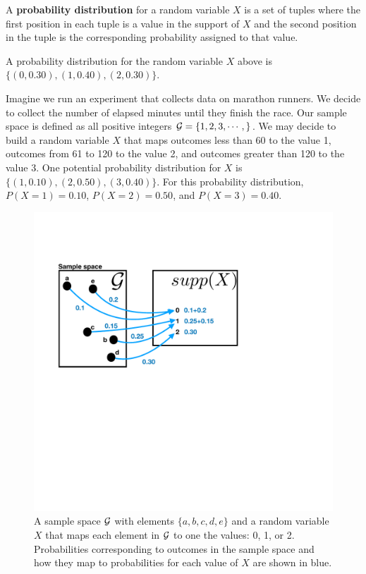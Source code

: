 A \textbf{probability distribution} for a random variable $X$ is a set of tuples where the first position in each tuple is a value in the support of $X$ and the second position in the tuple is the corresponding probability assigned to that value. 

\ex A probability distribution for the random variable $X$ above is $\{(0,0.30),(1,0.40),(2,0.30)\}$.

\ex Imagine we run an experiment that collects data on marathon runners. We decide to collect the number of elapsed minutes until they finish the race. Our sample space is defined as all positive integers $\mathcal{G} = \{1,2,3,\cdots,\}$. We may decide to build a random variable $X$ that maps outcomes less than 60 to the value 1, outcomes from 61 to 120 to the value 2, and outcomes greater than 120 to the value 3. One potential probability distribution for $X$ is $\{(1,0.10),(2,0.50),(3,0.40)\}$. For this probability distribution, $P(X=1) = 0.10$, $P(X=2) = 0.50$, and $P(X=3) = 0.40$.

\begin{figure}[ht!]
    \includegraphics{chapters/chapter2/rvsLink.pdf}
    \caption[List]{A sample space $\mathcal{G}$ with elements $\{a,b,c,d,e\}$ and a random variable $X$ that maps each element in $\mathcal{G}$ to one the values: 0, 1, or 2. Probabilities corresponding to outcomes in the sample space and how they map to probabilities for each value of $X$ are shown in blue.}
\end{figure}

